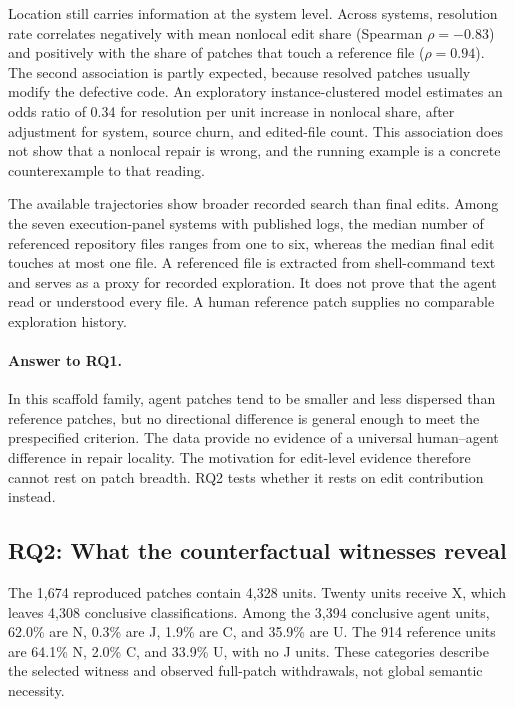 \documentclass[a4paper,fleqn]{cas-sc}
\newcommand{\lab}[1]{\textsf{#1}}
\begin{document}
Location still carries information at the system level. Across systems, resolution rate correlates negatively with mean nonlocal edit share (Spearman $\rho=-0.83$) and positively with the share of patches that touch a reference file ($\rho=0.94$). The second association is partly expected, because resolved patches usually modify the defective code. An exploratory instance-clustered model estimates an odds ratio of 0.34 for resolution per unit increase in nonlocal share, after adjustment for system, source churn, and edited-file count. This association does not show that a nonlocal repair is wrong, and the running example is a concrete counterexample to that reading.

The available trajectories show broader recorded search than final edits. Among the seven execution-panel systems with published logs, the median number of referenced repository files ranges from one to six, whereas the median final edit touches at most one file. A referenced file is extracted from shell-command text and serves as a proxy for recorded exploration. It does not prove that the agent read or understood every file. A human reference patch supplies no comparable exploration history.

\paragraph{Answer to RQ1.}
In this scaffold family, agent patches tend to be smaller and less dispersed than reference patches, but no directional difference is general enough to meet the prespecified criterion. The data provide no evidence of a universal human--agent difference in repair locality. The motivation for edit-level evidence therefore cannot rest on patch breadth. RQ2 tests whether it rests on edit contribution instead.

\subsection{RQ2: What the counterfactual witnesses reveal}\label{sec:rq2}

The 1,674 reproduced patches contain 4,328 units. Twenty units receive \lab{X}, which leaves 4,308 conclusive classifications. Among the 3,394 conclusive agent units, 62.0\% are \lab{N}, 0.3\% are \lab{J}, 1.9\% are \lab{C}, and 35.9\% are \lab{U}. The 914 reference units are 64.1\% \lab{N}, 2.0\% \lab{C}, and 33.9\% \lab{U}, with no \lab{J} units. These categories describe the selected witness and observed full-patch withdrawals, not global semantic necessity.
\end{document}
